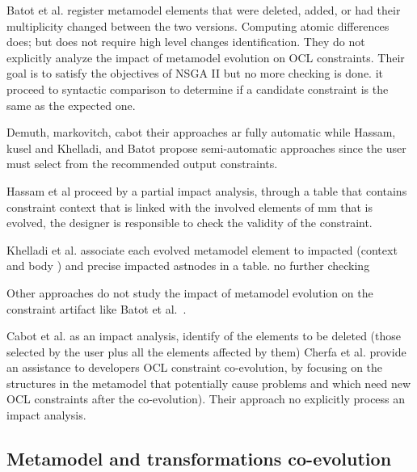Batot et al. \cite{batot2017heuristic} register metamodel elements that were deleted, added, or had their multiplicity changed between the two versions. Computing atomic differences does; but does not require high level changes identification. They do not explicitly analyze the impact of metamodel evolution on OCL constraints. Their goal is to satisfy the objectives of NSGA II  but no more checking is done. it proceed to syntactic comparison to determine if a candidate constraint is the same as the expected one.
  
   
  Demuth, markovitch, cabot \cite{10.1007/978-3-642-41533-3_18,markovic2008refactoring,cabot2004automatic} their approaches ar fully automatic while Hassam, kusel and Khelladi, and Batot \cite{hassam2011assistance,kusel2014systematic,khelladi2017semi,8101267} propose semi-automatic approaches since the user must select from the recommended output constraints. 
 
Hassam et al \cite{hassam2011assistance} proceed by a partial impact analysis, through a table that contains  constraint context that is linked with the involved elements of mm that is evolved, the designer is responsible to check the validity of the constraint. 

Khelladi et al. \cite{khelladi2017semi}  associate each evolved metamodel element to impacted (context and body ) and precise impacted astnodes in a table. no further checking

Other approaches do not study the impact of metamodel evolution on the constraint artifact like Batot et al. \cite{8101267}.

Cabot et al. \cite{cabot2004automatic} as an impact analysis, identify of the elements to be deleted (those selected by the user plus all the elements affected by them)
Cherfa et al. \cite{cherfa2021identifying}  provide an assistance to developers OCL constraint co-evolution, by focusing on the structures in the metamodel that potentially cause problems and which need new OCL constraints after the co-evolution). Their approach no explicitly process an impact analysis.%
 
\subsection{Metamodel and transformations co-evolution}

